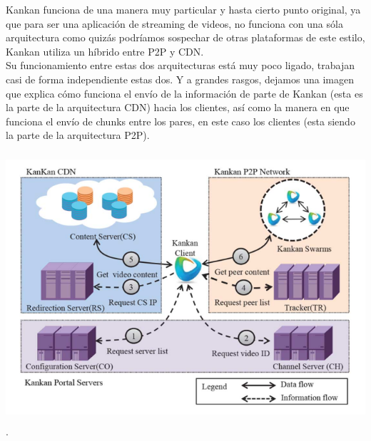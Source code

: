\documentclass[12pt]{report}
\begin{document}
Kankan funciona de una manera muy particular y hasta cierto punto original, ya que para ser una aplicación de streaming de videos, no funciona con una sóla arquitectura como quizás podríamos sospechar de otras plataformas de este estilo, Kankan utiliza un híbrido entre P2P y CDN.\\
Su funcionamiento entre estas dos arquitecturas está muy poco ligado, trabajan casi de forma independiente estas dos. Y a grandes rasgos, dejamos una imagen que explica cómo funciona el envío de la información de parte de Kankan (esta es la parte de la arquitectura CDN) hacia los clientes, así como la manera en que funciona el envío de chunks entre los pares, en este caso los clientes (esta siendo la parte de la arquitectura P2P).

\includegraphics[height=10cm]{images/img1}.
\end{document}
